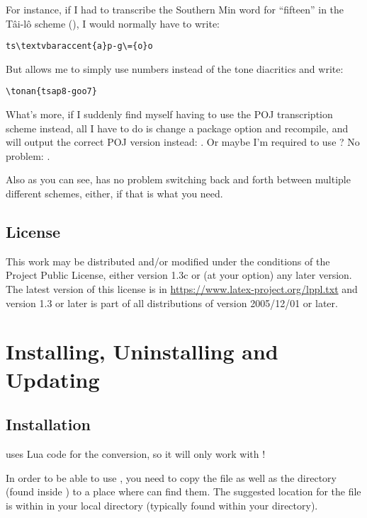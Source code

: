 \documentclass{ltxdockit}
\begin{document}
For instance, if I had to transcribe the Southern Min word for \enquote{fifteen}
in the T\^{a}i-l\^{o} scheme (), I would normally have to write:

\begin{lstlisting}[language={[latex]tex}]
ts\textvbaraccent{a}p-g\={o}o
\end{lstlisting}

But \transconv{} allows me to simply use numbers instead of the tone
diacritics and write:

\begin{lstlisting}[language={[latex]tex}]
\tonan{tsap8-goo7}
\end{lstlisting}

What's more, if I suddenly find myself having to use the POJ transcription
scheme instead, all I have to do is change a package option and recompile, and
\transconv{} will output the correct POJ version instead: .
Or maybe I'm required to use ? No problem:
.

Also as you can see, \transconv{} has no problem switching back and forth
between multiple different schemes, either, if that is what you need.

\subsection{License}

This work may be distributed and/or modified under the conditions of the
 Project Public License, either version 1.3c or (at your option)
any later version. The latest version of this license is in
\url{https://www.latex-project.org/lppl.txt} and version 1.3 or later is part of
all distributions of  version 2005/12/01 or later.

\section{Installing, Uninstalling and Updating}

\subsection{Installation}

\transconv{} uses Lua code for the conversion, so it will only work with
!

In order to be able to use \transconv{}, you need to copy the
 file as well as the  directory (found inside
) to a place where  can find them. The
suggested location for the  file is within  in
your local  directory (typically found within your 
directory).
\end{document}
